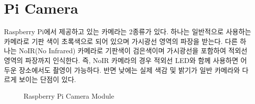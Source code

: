 \documentclass[11pt
  , a4paper
  , article
  , oneside
]{memoir}
\begin{document}
\section{Pi Camera}
Raspberry Pi에서 제공하고 있는 카메라는 2종류가 있다. 하나는 일반적으로 사용하는 카메라로 기판 색이 
초록색으로 되어 있으며 가시광선 영역의 파장을 받는다. 다른 하나는 NoIR(No Infrared) 카메라로 기판색이 
검은색이며 가시광선을 포함하여 적외선 영역의 파장까지 인식한다. 즉, NoIR 카메라의 경우 적외선 LED와 
함께 사용하면 어두운 장소에서도 촬영이 가능하다. 반면 낮에는 실제 색감 및 밝기가 일반 카메라와 다르게 
보이는 단점이 있다.
\begin{figure}[h]
  \centering
  \hfill
  \caption{Raspberry Pi Camera Module}
  \label{fig:rpi_cam}
\end{figure}
\end{document}
